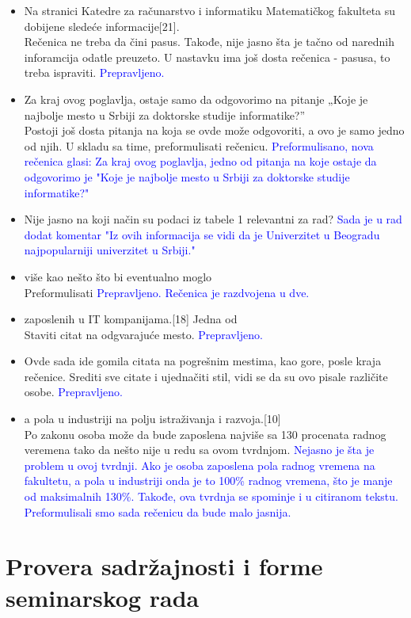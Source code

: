 \documentclass[a4paper]{report}
\newcommand{\odgovor}[1]{\textcolor{blue}{#1}}
\begin{document}
\begin{itemize}
\item Na stranici Katedre za računarstvo i informatiku Matematičkog fakulteta su dobijene sledeće informacije[21].\\
Rečenica ne treba da čini pasus. Takođe, nije jasno šta je tačno od narednih inforamcija odatle preuzeto. 
U nastavku ima još dosta rečenica - pasusa, to treba ispraviti. \odgovor{Prepravljeno.}
\item Za kraj ovog poglavlja, ostaje samo da odgovorimo na pitanje „Koje je najbolje mesto u Srbiji za doktorske studije informatike?”\\
Postoji još dosta pitanja na koja se ovde može odgovoriti, a ovo je samo jedno od njih. U skladu sa time, preformulisati rečenicu. \odgovor{Preformulisano, nova rečenica glasi: Za kraj ovog poglavlja, jedno od pitanja na koje ostaje da odgovorimo je "Koje je najbolje mesto u Srbiji za doktorske studije informatike?"\ }
\item Nije jasno na koji način su podaci iz tabele 1 relevantni za rad? \odgovor{Sada je u rad dodat komentar "{}Iz ovih informacija se vidi da je Univerzitet u Beogradu najpopularniji univerzitet u Srbiji."{}}
\item više kao
nešto što bi eventualno moglo\\
Preformulisati
\odgovor{Prepravljeno. Rečenica je razdvojena u dve.}
\item zaposlenih u IT kompanijama.[18] Jedna od \\
Staviti citat na odgvarajuće mesto.
\odgovor{Prepravljeno.}
\item Ovde sada ide gomila citata na pogrešnim mestima, kao gore, posle kraja rečenice. Srediti sve citate i ujednačiti stil, vidi se da su ovo pisale različite osobe. \odgovor{Prepravljeno.}
\item a pola u industriji na polju istraživanja i razvoja.[10]\\
Po zakonu osoba može da bude zaposlena najviše sa 130 procenata radnog veremena tako da nešto nije u redu sa ovom tvrdnjom.
\odgovor{Nejasno je šta je problem u ovoj tvrdnji. Ako je osoba zaposlena pola radnog vremena na fakultetu, a pola u industriji onda je to 100\% radnog vremena, što je manje od maksimalnih 130\%. Takođe, ova tvrdnja se spominje i u citiranom tekstu. Preformulisali smo sada rečenicu da bude malo jasnija.}
\end{itemize}

\section{Provera sadržajnosti i forme seminarskog rada}
\end{document}
